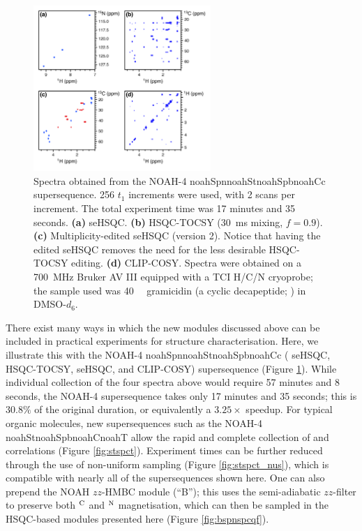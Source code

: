 \documentclass[11pt]{article}
\newcommand*{\noahfour}[4]{\csname noah#1\endcsname\csname noah#2\endcsname\csname noah#3\endcsname\csname noah#4\endcsname}
\newcommand*{\noahB}{B}
\newcommand*{\carbon}{\ce{^{13}C}}
\newcommand*{\nitrogen}{\ce{^{15}N}}
\newcommand*{\magn}[1]{\ce{^1H}$^{#1}$}
\newcommand*{\figref}[1]{Figure \ref{fig:#1}}
\begin{document}


\begin{figure}
    \centering
    \includegraphics[width=0.6\textwidth]{spstspcc.png}
    \caption{
        Spectra obtained from the NOAH-4 \noahfour{Spn}{St}{Spb}{Cc} supersequence.
        256 $t_1$ increments were used, with 2 scans per increment.
        The total experiment time was 17 minutes and 35 seconds.
        \textbf{(a)} \nitrogen{} seHSQC.
        \textbf{(b)} \carbon{} HSQC-TOCSY (\SI{30}{ms} mixing, $f = 0.9$).
        \textbf{(c)} Multiplicity-edited \carbon{} seHSQC (version 2). Notice that having the edited seHSQC removes the need for the less desirable HSQC-TOCSY editing.
        \textbf{(d)} CLIP-COSY.
        Spectra were obtained on a \SI{700}{\MHz} Bruker AV III equipped with a TCI H/C/N cryoprobe; the sample used was \SI{40}{\milli\molar} gramicidin (a cyclic decapeptide; ) in DMSO-$d_6$.
    }
    \label{fig:example_spec}
\end{figure}

There exist many ways in which the new modules discussed above can be included in practical experiments for structure characterisation.
Here, we illustrate this with the NOAH-4 \noahfour{Spn}{St}{Spb}{Cc} (\nitrogen{} seHSQC, \carbon{} HSQC-TOCSY, \carbon{} seHSQC, and CLIP-COSY) supersequence (\figref{example_spec}).
While individual collection of the four spectra above would require 57 minutes and 8 seconds, the NOAH-4 supersequence takes only 17 minutes and 35 seconds; this is $30.8\%$ of the original duration, or equivalently a $3.25\times$ speedup.
For typical organic molecules, new supersequences such as the NOAH-4 \noahfour{St}{Spb}{C}{T} allow the rapid and complete collection of  and  correlations (\figref{stspct}).
Experiment times can be further reduced through the use of non-uniform sampling (\figref{stspct_nus}), which is compatible with nearly all of the supersequences shown here.
One can also prepend the NOAH $zz$-HMBC module (``\noahB{}'');\autocite{Kupce2019JMR} this uses the semi-adiabatic $zz$-filter to preserve both \magn{\ce{C}} and \magn{\ce{N}} magnetisation, which can then be sampled in the HSQC-based modules presented here (\figref{bspnspcqf}).
\end{document}
